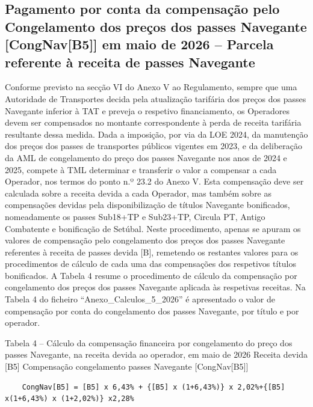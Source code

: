 \documentclass[
  a4paper,
]{article}
\begin{document}
\subsection{Pagamento por conta da compensação pelo Congelamento dos
preços dos passes Navegante {[}CongNav{[}B5{]}{]} em maio de 2026 --
Parcela referente à receita de passes
Navegante}\label{pagamento-por-conta-da-compensauxe7uxe3o-pelo-congelamento-dos-preuxe7os-dos-passes-navegante-congnavb5-em-maio-de-2026-parcela-referente-uxe0-receita-de-passes-navegante}

Conforme previsto na secção VI do Anexo V ao Regulamento, sempre que uma
Autoridade de Transportes decida pela atualização tarifária dos preços
dos passes Navegante inferior à TAT e preveja o respetivo financiamento,
os Operadores devem ser compensados no montante correspondente à perda
de receita tarifária resultante dessa medida. Dada a imposição, por via
da LOE 2024, da manutenção dos preços dos passes de transportes públicos
vigentes em 2023, e da deliberação da AML de congelamento do preço dos
passes Navegante nos anos de 2024 e 2025, compete à TML determinar e
transferir o valor a compensar a cada Operador, nos termos do ponto n.º
23.2 do Anexo V. Esta compensação deve ser calculada sobre a receita
devida a cada Operador, mas também sobre as compensações devidas pela
disponibilização de títulos Navegante bonificados, nomeadamente os
passes Sub18+TP e Sub23+TP, Circula PT, Antigo Combatente e bonificação
de Setúbal. Neste procedimento, apenas se apuram os valores de
compensação pelo congelamento dos preços dos passes Navegante referentes
à receita de passes devida {[}B{]}, remetendo os restantes valores para
os procedimentos de cálculo de cada uma das compensações dos respetivos
títulos bonificados. A Tabela 4 resume o procedimento de cálculo da
compensação por congelamento dos preços dos passes Navegante aplicada às
respetivas receitas. Na Tabela 4 do ficheiro
``Anexo\_Calculos\_5\_2026'' é apresentado o valor de compensação por
conta do congelamento dos passes Navegante, por título e por operador.

Tabela 4 -- Cálculo da compensação financeira por congelamento do preço
dos passes Navegante, na receita devida ao operador, em maio de 2026
Receita devida {[}B5{]} Compensação congelamento passes Navegante
{[}CongNav{[}B5{]}{]}

\begin{verbatim}
    CongNav[B5] = [B5] x 6,43% + {[B5] x (1+6,43%)} x 2,02%+{[B5] x(1+6,43%) x (1+2,02%)} x2,28%
\end{verbatim}
\end{document}
